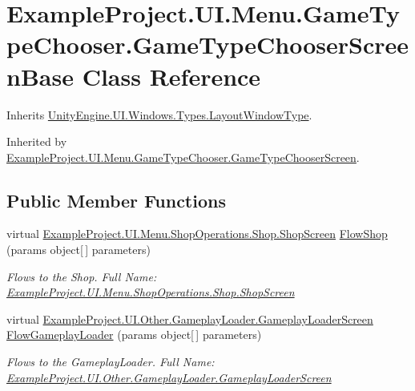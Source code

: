 \hypertarget{class_example_project_1_1_u_i_1_1_menu_1_1_game_type_chooser_1_1_game_type_chooser_screen_base}{}\section{Example\+Project.\+U\+I.\+Menu.\+Game\+Type\+Chooser.\+Game\+Type\+Chooser\+Screen\+Base Class Reference}
\label{class_example_project_1_1_u_i_1_1_menu_1_1_game_type_chooser_1_1_game_type_chooser_screen_base}


Inherits \hyperlink{class_unity_engine_1_1_u_i_1_1_windows_1_1_types_1_1_layout_window_type}{Unity\+Engine.\+U\+I.\+Windows.\+Types.\+Layout\+Window\+Type}.



Inherited by \hyperlink{class_example_project_1_1_u_i_1_1_menu_1_1_game_type_chooser_1_1_game_type_chooser_screen}{Example\+Project.\+U\+I.\+Menu.\+Game\+Type\+Chooser.\+Game\+Type\+Chooser\+Screen}.

\subsection*{Public Member Functions}
\begin{DoxyCompactItemize}
\item 
virtual \hyperlink{class_example_project_1_1_u_i_1_1_menu_1_1_shop_operations_1_1_shop_1_1_shop_screen}{Example\+Project.\+U\+I.\+Menu.\+Shop\+Operations.\+Shop.\+Shop\+Screen} \hyperlink{class_example_project_1_1_u_i_1_1_menu_1_1_game_type_chooser_1_1_game_type_chooser_screen_base_a21d9f4978a00ffad517305fc7f277a5e}{Flow\+Shop} (params object\mbox{[}$\,$\mbox{]} parameters)
\begin{DoxyCompactList}\small\item\em Flows to the Shop. Full Name\+: \hyperlink{class_example_project_1_1_u_i_1_1_menu_1_1_shop_operations_1_1_shop_1_1_shop_screen}{Example\+Project.\+U\+I.\+Menu.\+Shop\+Operations.\+Shop.\+Shop\+Screen} \end{DoxyCompactList}\item 
virtual \hyperlink{class_example_project_1_1_u_i_1_1_other_1_1_gameplay_loader_1_1_gameplay_loader_screen}{Example\+Project.\+U\+I.\+Other.\+Gameplay\+Loader.\+Gameplay\+Loader\+Screen} \hyperlink{class_example_project_1_1_u_i_1_1_menu_1_1_game_type_chooser_1_1_game_type_chooser_screen_base_aebaf7dfa48adeceff6d763361a3934f0}{Flow\+Gameplay\+Loader} (params object\mbox{[}$\,$\mbox{]} parameters)
\begin{DoxyCompactList}\small\item\em Flows to the Gameplay\+Loader. Full Name\+: \hyperlink{class_example_project_1_1_u_i_1_1_other_1_1_gameplay_loader_1_1_gameplay_loader_screen}{Example\+Project.\+U\+I.\+Other.\+Gameplay\+Loader.\+Gameplay\+Loader\+Screen} \end{DoxyCompactList}\end{DoxyCompactItemize}
